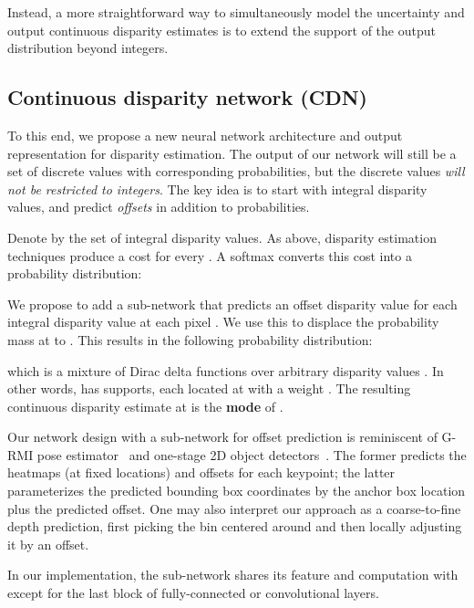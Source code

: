 \documentclass{article}
\begin{document}
Instead, a more straightforward way to simultaneously model the uncertainty and output continuous disparity estimates is to extend the support of the output distribution beyond integers.

\subsection{Continuous disparity network (CDN)}
\label{ssec:CDN}
To this end, we propose a new neural network architecture and output representation for disparity estimation.
The output of our network will still be a set of discrete values with corresponding probabilities, but the discrete values \emph{will not be restricted to integers}.
The key idea is to start with integral disparity values, and predict \emph{offsets} in addition to probabilities.



Denote by  the set of integral disparity values.
As above, disparity estimation techniques produce a cost  for every .
A softmax converts this cost into a probability distribution:


We propose to add a sub-network  that predicts an offset disparity value for each integral disparity value  at each pixel .
We use this to displace the probability mass at  to .
This results in the following probability distribution:
\iffalse

\fi

which is a mixture of Dirac delta functions over arbitrary disparity values .
In other words,  has  supports, each located at  with a weight . The resulting continuous disparity estimate  at  is the \textbf{mode} of .

Our network design with a sub-network for offset prediction is reminiscent of G-RMI pose estimator~\cite{papandreou2017towards} and one-stage 2D object detectors~\cite{liu2016ssd,redmon2016you,lin2017focal}. The former 
predicts the heatmaps (at fixed locations) and offsets for each keypoint; the latter parameterizes the predicted bounding box coordinates by the anchor box location plus the predicted offset. One may also interpret our approach as a coarse-to-fine depth prediction, first picking the bin centered around  and then locally adjusting it by an offset.

In our implementation, the sub-network  shares its feature and computation with  except for the last block of  fully-connected or convolutional layers. 
\end{document}
